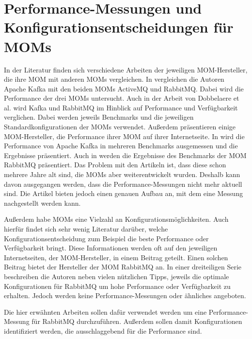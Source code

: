 \section{Performance-Messungen und Konfigurationsentscheidungen für MOMs}
\label{sec:config_mom}
In der Literatur finden sich verschiedene Arbeiten der jeweiligen MOM-Hersteller, die ihre MOM mit anderen MOMs vergleichen. In \cite{kafka} vergleichen die Autoren Apache Kafka mit den beiden MOMs ActiveMQ und RabbitMQ. Dabei wird die Performance der drei MOMs untersucht. Auch in der Arbeit von Dobbelaere et al. \cite{Dobbelaere2017} wird Kafka und RabbitMQ im Hinblick auf Performance und Verfügbarkeit verglichen. Dabei werden jeweils Benchmarks und die jeweiligen Standardkonfigurationen der MOMs verwendet. Außerdem präsentieren einige MOM-Hersteller, die Performance ihrer MOM auf ihrer Internetseite. In \cite{kafkaconfig} wird die Performance von Apache Kafka in mehreren Benchmarks ausgemessen und die Ergebnisse präsentiert. Auch in \cite{rabbitperf} werden die Ergebnisse des Benchmarks der MOM RabbitMQ präsentiert. Das Problem mit den Artikeln ist, dass diese schon mehrere Jahre alt sind, die MOMs aber weiterentwickelt wurden. Deshalb kann davon ausgegangen werden, dass die Performance-Messungen nicht mehr aktuell sind. Die Artikel bieten jedoch einen genauen Aufbau an, mit dem eine Messung nachgestellt werden kann. \par
Außerdem habe MOMs eine Vielzahl an Konfigurationsmöglichkeiten. Auch hierfür findet sich sehr wenig Literatur darüber, welche Konfigurationsentscheidung zum Beispiel die beste Performance oder Verfügbarkeit bringt. Diese Informationen werden oft auf den jeweiligen Internetseiten, der MOM-Hersteller, in einem Beitrag geteilt. Einen solchen Beitrag bietet der Hersteller der MOM RabbitMQ an. In einer dreiteiligen Serie \cite{rabbitconfig} beschreiben die Autoren neben vielen nützlichen Tipps, jeweils die optimale Konfigurationen für RabbitMQ um hohe Performance oder Verfügbarkeit zu erhalten. Jedoch werden keine Performance-Messungen oder ähnliches angeboten.\par
Die hier erwähnten Arbeiten sollen dafür verwendet werden um eine Performance-Messung für RabbitMQ durchzuführen. Außerdem sollen damit Konfigurationen identifiziert werden, die ausschlaggebend für die Performance sind.

